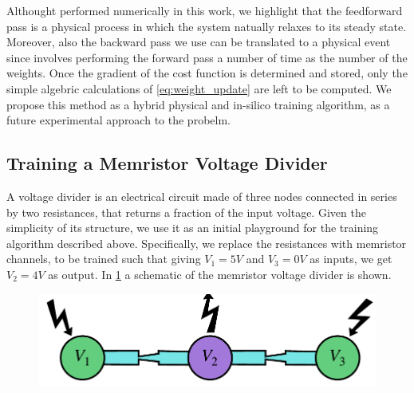\documentclass[reprint,superscriptaddress,prb,showkeys]{revtex4-2}
\begin{document}
Althought performed numerically in this work, we highlight that the feedforward pass is a physical process in which the system natually relaxes to its steady state. Moreover, also the backward pass we use can be translated to a physical event since involves performing the forward pass a number of time as the number of the weights. Once the gradient of the cost function is determined and stored, only the simple algebric calculations of \cref{eq:weight_update} are left to be computed. We propose this method as a hybrid physical and in-silico training algorithm, as a future experimental approach to the probelm.

\subsection{Training a Memristor Voltage Divider}

A voltage divider is an electrical circuit made of three nodes connected in series by two resistances, that returns a fraction of the input voltage. Given the simplicity of its structure, we use it as an initial playground for the training algorithm described above. Specifically, we replace the resistances with memristor channels, to be trained such that giving $V_1 = 5V$ and $V_3 = 0V$ as inputs, we get $V_2 = 4V$ as output. In \cref{fig:vd_scheme} a schematic of the memristor voltage divider is shown.

\begin{figure}[h]
    \centering
    \includegraphics[width=0.8\columnwidth]{plots/voltage_divider/vd_scheme.pdf}
    \caption{}\label{fig:vd_scheme}
\end{figure} 
\end{document}
